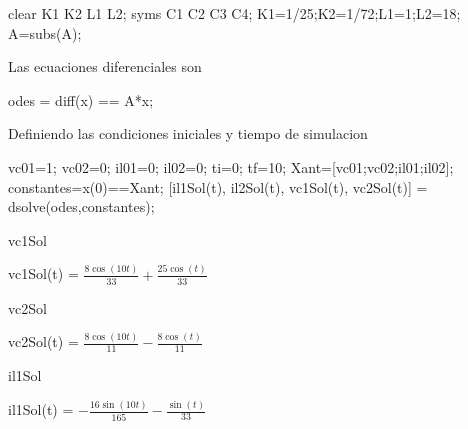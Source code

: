 \documentclass[10pt,a4paper]{article} %
\begin{document}
\begin{matlabcode}
	clear K1 K2 L1 L2;
	syms C1 C2 C3 C4;
	K1=1/25;K2=1/72;L1=1;L2=18;
	A=subs(A);
\end{matlabcode}

\begin{par}
	\begin{flushleft}
		Las ecuaciones diferenciales son
	\end{flushleft}
\end{par}

\begin{matlabcode}
	odes = diff(x) == A*x;
\end{matlabcode}

\begin{par}
	\begin{flushleft}
		Definiendo las condiciones iniciales y tiempo de simulacion
	\end{flushleft}
\end{par}

\begin{matlabcode}
	vc01=1;
	vc02=0;
	il01=0;
	il02=0;
	ti=0;
	tf=10;
	Xant=[vc01;vc02;il01;il02];
	constantes=x(0)==Xant;
	[il1Sol(t), il2Sol(t), vc1Sol(t), vc2Sol(t)] = dsolve(odes,constantes);
\end{matlabcode}



\begin{matlabcode}
	vc1Sol
\end{matlabcode}
\begin{matlabsymbolicoutput}
	vc1Sol(t) = 
	$\displaystyle \frac{8 \cos \left(10 t\right)}{33}+\frac{25 \cos \left(t\right)}{33}$
\end{matlabsymbolicoutput}


\begin{matlabcode}
	vc2Sol
\end{matlabcode}
\begin{matlabsymbolicoutput}
	vc2Sol(t) = 
	$\displaystyle \frac{8 \cos \left(10 t\right)}{11}-\frac{8 \cos \left(t\right)}{11}$
\end{matlabsymbolicoutput}


\begin{matlabcode}
	il1Sol
\end{matlabcode}
\begin{matlabsymbolicoutput}
	il1Sol(t) = 
	$\displaystyle -\frac{16 \sin \left(10 t\right)}{165}-\frac{\sin \left(t\right)}{33}$
\end{matlabsymbolicoutput}
\end{document}
